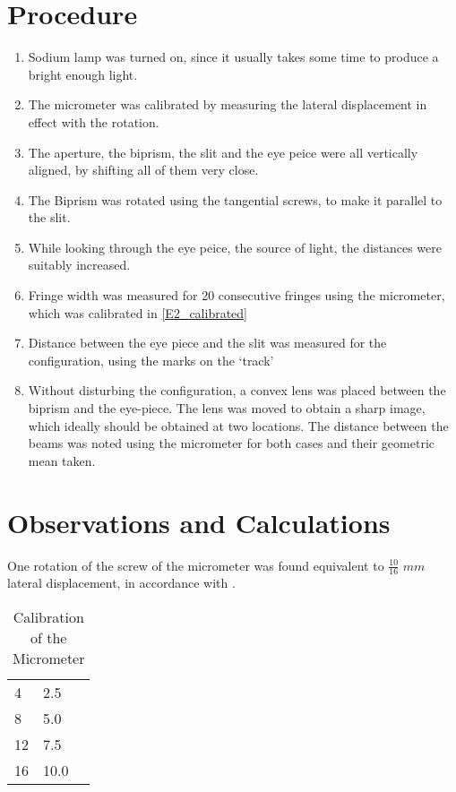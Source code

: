\section{Procedure}
	\begin{enumerate}
		\item Sodium lamp was turned on, since it usually takes some time to produce a bright enough light.
		\item The micrometer was calibrated by measuring the lateral displacement in effect with the rotation. \label{E2_calibrated}
		\item The aperture, the biprism, the slit and the eye peice were all vertically aligned, by shifting all of them very close.
		\item The Biprism was rotated using the tangential screws, to make it parallel to the slit.
		\item While looking through the eye peice, the source of light, the distances were suitably increased.
		\item Fringe width was measured for 20 consecutive fringes using the micrometer, which was calibrated in \autoref{E2_calibrated}
		\item Distance between the eye piece and the slit was measured for the configuration, using the marks on the `track'
		\item Without disturbing the configuration, a convex lens was placed between the biprism and the eye-piece. The lens was moved to obtain a sharp image, which ideally should be obtained at two locations. The distance between the beams was noted using the micrometer for both cases and their geometric mean taken.
	\end{enumerate}

\section{Observations and Calculations}	
	One rotation of the screw of the micrometer was found equivalent to $\frac{10}{16}$ $mm$ lateral displacement, in accordance with \label{E2_cal}.\\

	\begin{table}
		\myfloatalign
		\begin{tabularx}{\textwidth}{Xll}
			\hline
			\tableheadline{Rotations of the Micrometer Screw} 	&	\tableheadline{Lateral Displacement ($mm$)}\\
			\hline
				4	&	2.5\\
				8	&	5.0\\
				12	&	7.5\\
				16	&	10.0\\
			\hline
		\end{tabularx}
		\caption{Calibration of the Micrometer}
		\label{E2_cal}
	\end{table}

